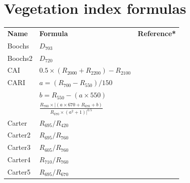 \documentclass[peerreview]{IEEEtran}
\begin{document}
\section{Vegetation index formulas}

\begingroup\scriptsize
\setlength\tabcolsep{4pt}  %
\begin{xtabular*}{0.3\textwidth}{lll}
	\bfseries{Name} & \bfseries{Formula}                                                                                  & \bfseries{Reference*}      \\
	Boochs          & $D_{703}$                                                                                           & \cite{boochs1990}       \\
	Boochs2         & $D_{720}$                                                                                           & \cite{boochs1990}       \\
	CAI             & $0.5 \times (R_{2000} + R_{2200}) -R_{2100}$                                                        & \cite{nagler2003}       \\
	\midrule
	CARI            & $a = (R_{700}-R_{550}) / 150$                                                                       & \cite{walthall1994}          \\
	& $b = R_{550}-(a\times 550)$                                                                                         &                                  \\
	& $\frac{R_{700}\times | (a\times 670+R_{670}+b)}{R_{670}\times(a^2+1)| ^{0.5}}$                                      &                                  \\
	\midrule
	Carter          & $R_{695}/R_{420}$                                                                                   & \cite{carter1994}              \\
	Carter2         & $R_{695}/R_{760}$                                                                                   & \cite{carter1994}              \\
	Carter3         & $R_{605}/R_{760}$                                                                                   & \cite{carter1994}              \\
	Carter4         & $R_{710}/R_{760}$                                                                                   & \cite{carter1994}              \\
	Carter5         & $R_{695}/R_{670}$                                                                                   & \cite{carter1994}              \\

\end{xtabular*}
\end{document}
